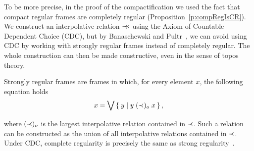 To be more precise, in the proof of the compactification we used the fact that compact regular frames are completely regular (Proposition~\ref{p:compRegIsCR}).
We construct an interpolative relation $\prec\mkern-8mu\prec$ using the Axiom of Countable Dependent Choice (CDC), but by Banaschewski and Pultr~\cite{banaschewski2002constructive}, we can avoid using CDC by working with strongly regular frames instead of completely regular. The whole construction can then be made constructive, even in the sense of topos theory.

Strongly regular frames are frames in which, for every element $x$, the following equation holds
$$ x = \bigvee \Set{ y | y\;(\prec)_o\;x }, $$

\noindent where $(\prec)_o$ is the largest interpolative relation contained in $\prec$. Such a relation can be constructed as the union of all interpolative relations contained in $\prec$. Under CDC, complete regularity is precisely the same as strong regularity~\cite{banaschewski2002constructive}.
